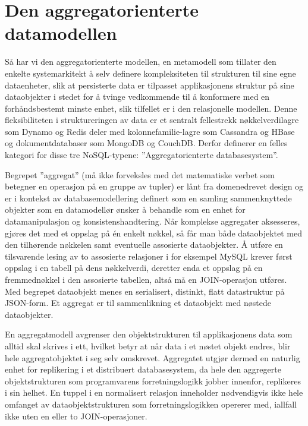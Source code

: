 \section{Den aggregatorienterte datamodellen}

Så har vi den aggregatorienterte modellen, en metamodell som tillater den enkelte systemarkitekt å selv definere kompleksiteten til strukturen til sine egne dataenheter, slik at persisterte data er tilpasset applikasjonens struktur på sine dataobjekter i stedet for å tvinge vedkommende til å konformere med en forhåndsbestemt minste enhet, slik tilfellet er i den relasjonelle modellen. Denne fleksibiliteten i struktureringen av data er et sentralt fellestrekk nøkkelverdilagre som Dynamo og Redis deler med kolonnefamilie-lagre som Cassandra og HBase og dokumentdatabaser som MongoDB og CouchDB. Derfor definerer \cite{sadalage2013} en felles kategori for disse tre NoSQL-typene: ''Aggregatorienterte databasesystem''.

Begrepet ''aggregat'' (må ikke forveksles med det matematiske verbet som betegner en operasjon på en gruppe av tupler) er lånt fra domenedrevet design og er i kontekst av databasemodellering definert som en samling sammenknyttede objekter som en datamodellør ønsker å behandle som en enhet for datamanipulasjon og konsistenshandtering. Når komplekse aggregater aksesseres, gjøres det med et oppslag på én enkelt nøkkel, så får man både dataobjektet med den tilhørende nøkkelen samt eventuelle assosierte dataobjekter. Å utføre en tilsvarende lesing av to assosierte relasjoner i for eksempel MySQL krever først oppslag i en tabell på dens nøkkelverdi, deretter enda et oppslag på en fremmednøkkel i den assosierte tabellen, altså må en JOIN-operasjon utføres. Med begrepet dataobjekt menes en serialisert, distinkt, flatt datastruktur på JSON-form. Et aggregat er til sammenlikning et dataobjekt med nøstede dataobjekter.

En aggregatmodell avgrenser den objektstrukturen til applikasjonens data som alltid skal skrives i ett, hvilket betyr at når data i et nøstet objekt endres, blir hele aggregatobjektet i seg selv omskrevet. Aggregatet utgjør dermed en naturlig enhet for replikering i et distribuert databasesystem, da hele den aggregerte objektstrukturen som programvarens forretningslogikk jobber innenfor, replikeres i sin helhet. En tuppel i en normalisert relasjon inneholder nødvendigvis ikke hele omfanget av dataobjektstrukturen som forretningslogikken opererer med, iallfall ikke uten en eller to JOIN-operasjoner.

